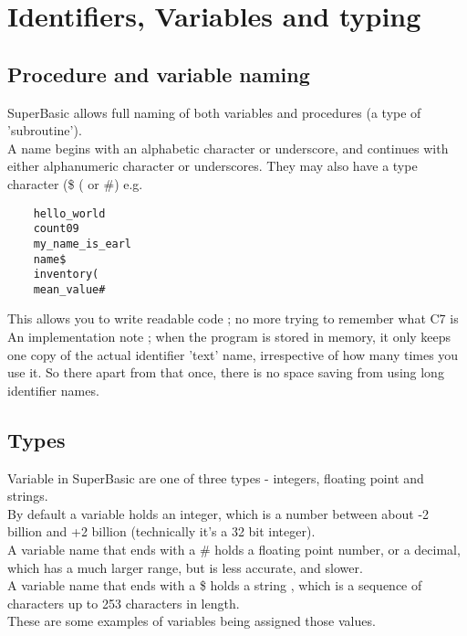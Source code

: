 \chapter{Identifiers, Variables and typing}

\section{Procedure and variable naming}

SuperBasic allows full naming of both variables and procedures (a type of 'subroutine').\\
A name begins with an alphabetic character or underscore, and continues with either alphanumeric character or underscores. They may also have a type character (\$ ( or \#) e.g.

\begin{verbatim}
	hello_world
	count09
	my_name_is_earl
	name$
	inventory(
	mean_value#
\end{verbatim}

This allows you to write readable code ; no more trying to remember what C7 is\\

An implementation note ; when the program is stored in memory, it only keeps one copy of the actual identifier 'text' name, irrespective of how many times you use it. So there apart from that once, there is no space saving from using long identifier names.

\section{Types}

Variable in SuperBasic are one of three types - integers, floating point and strings.\\

By default a variable holds an integer, which is a number between about -2 billion and +2 billion (technically it's a 32 bit integer).\\

A variable name that ends with a \# holds a floating point number, or a decimal, which has a much larger range, but is less accurate, and slower.\\

A variable name that ends with a \$ holds a string , which is a sequence of characters up to 253 characters in length.\\

These are some examples of variables being assigned those values.

